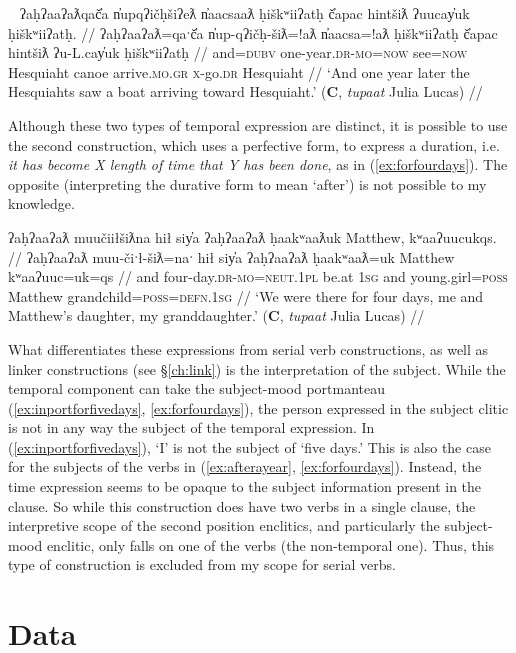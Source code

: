 \ex~ \label{ex:afterayear}
\begingl
\glpreamble ʔaḥʔaaʔaƛqač̓a n̓upqʔičḥšiʔeƛ n̓aacsaaƛ ḥiškʷiiʔatḥ č̓apac hintšiƛ ʔuucay̓uk ḥiškʷiiʔatḥ. //
\gla ʔaḥʔaaʔaƛ=qaˑč̓a n̓up-qʔičḥ-šiƛ=!aƛ n̓aacsa=!aƛ ḥiškʷiiʔatḥ č̓apac hintšiƛ ʔu-L.cay̓uk ḥiškʷiiʔatḥ //
\glb and=\textsc{dubv} one-year.\textsc{dr}-\textsc{mo}=\textsc{now} see=\textsc{now} Hesquiaht canoe arrive.\textsc{mo}.\textsc{gr} \textsc{x}-go.\textsc{dr} Hesquiaht //
\glft `And one year later the Hesquiahts saw a boat arriving toward Hesquiaht.' (\textbf{C}, \textit{tupaat} Julia Lucas) //
\endgl
\xe

Although these two types of temporal expression are distinct, it is possible to use the second construction, which uses a perfective form, to express a duration, i.e. \textit{it has become X length of time that Y has been done}, as in (\ref{ex:forfourdays}). The opposite (interpreting the durative form to mean `after') is not possible to my knowledge.

\ex \label{ex:forfourdays}
\begingl
\glpreamble ʔaḥʔaaʔaƛ muučiiłšiƛna hił siy̓a ʔaḥʔaaʔaƛ ḥaakʷaaƛuk Matthew, kʷaaʔuucukqs. //
\gla ʔaḥʔaaʔaƛ muu-čiˑł-šiƛ=naˑ hił siy̓a ʔaḥʔaaʔaƛ ḥaakʷaaƛ=uk Matthew kʷaaʔuuc=uk=qs //
\glb and four-day.\textsc{dr}-\textsc{mo}=\textsc{neut.1pl} be.at \textsc{1sg} and young.girl=\textsc{poss} Matthew grandchild=\textsc{poss}=\textsc{defn.1sg} //
\glft `We were there for four days, me and Matthew's daughter, my granddaughter.' (\textbf{C}, \textit{tupaat} Julia Lucas) //
\endgl
\xe

What differentiates these expressions from serial verb constructions, as well as linker constructions (see \S\ref{ch:link}) is the interpretation of the subject. While the temporal component can take the subject-mood portmanteau (\ref{ex:inportforfivedays}, \ref{ex:forfourdays}), the person expressed in the subject clitic is not in any way the subject of the temporal expression. In (\ref{ex:inportforfivedays}), `I' is not the subject of `five days.' This is also the case for the subjects of the verbs in (\ref{ex:afterayear}, \ref{ex:forfourdays}). Instead, the time expression seems to be opaque to the subject information present in the clause. So while this construction does have two verbs in a single clause, the interpretive scope of the second position enclitics, and particularly the subject-mood enclitic, only falls on one of the verbs (the non-temporal one). Thus, this type of construction is excluded from my scope for serial verbs.

\section{Data} \label{ch:sv:data}

